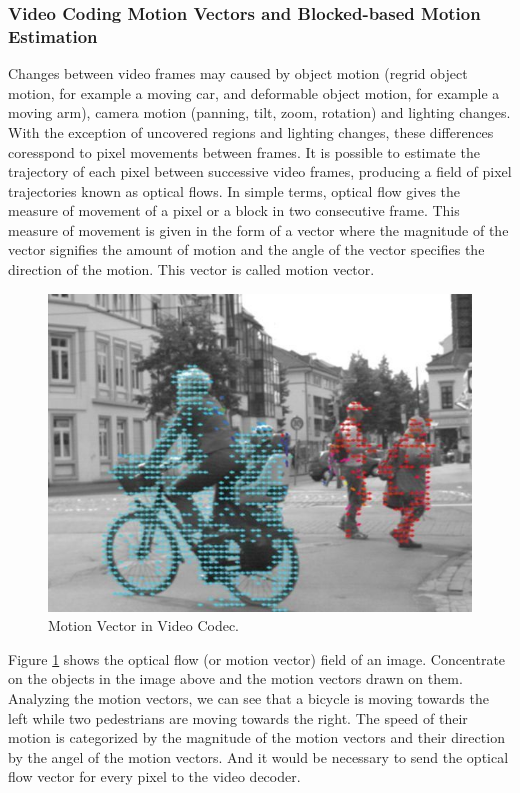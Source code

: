 \subsubsection{Video Coding Motion Vectors and Blocked-based Motion Estimation}
	Changes between video frames may caused by object motion (regrid object motion, for example a moving car, and deformable object motion, for example a moving arm), camera motion (panning, tilt, zoom, rotation) and lighting changes. With the exception of uncovered regions and lighting changes, these differences coresspond to pixel movements between frames. It is possible to estimate the trajectory of each pixel between successive video frames, producing a field of pixel trajectories known as optical flows. In simple terms, optical flow gives the measure of movement of a pixel or a block in two consecutive frame. This measure of movement is given in the form of a vector where the magnitude of the vector signifies the amount of motion and the angle of the vector specifies the direction of the motion. This vector is called motion vector. 
\begin{figure}
\centering
 \includegraphics[width=0.8\linewidth]{Figures/opticalflow.jpeg}
 \caption{Motion Vector in Video Codec.}
 \label{fig:opticalflow}
\end{figure}
Figure \ref{fig:opticalflow} shows the optical flow (or motion vector) field of an image. Concentrate on the objects in the image above and the motion vectors drawn on them. Analyzing the motion vectors, we can see that a bicycle is moving towards the left while two pedestrians are moving towards the right. The speed of their motion is categorized by the magnitude of the motion vectors and their direction by the angel of the motion vectors. And it would be necessary to send the optical flow vector for every pixel to the video decoder.

